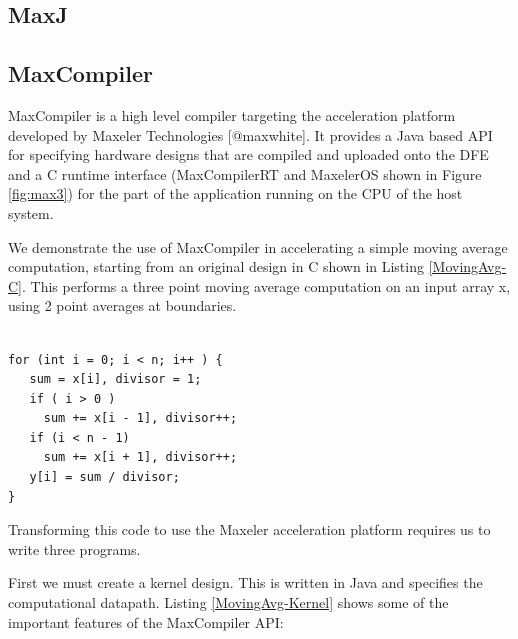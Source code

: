 \subsection{MaxJ}

\subsection{MaxCompiler}

MaxCompiler is a high level compiler targeting the acceleration
platform developed by Maxeler Technologies [@maxwhite]. It provides a
Java based API for specifying hardware designs that are compiled and
uploaded onto the DFE and a C runtime interface (MaxCompilerRT and
MaxelerOS shown in Figure \ref{fig:max3}) for the part of the
application running on the CPU of the host system.

We demonstrate the use of MaxCompiler in accelerating a simple moving
average computation, starting from an original design in C shown in
Listing \ref{MovingAvg-C}. This performs a three point moving average
computation on an input array x, using 2 point averages at boundaries.


\begin{lstlisting}

for (int i = 0; i < n; i++ ) {
   sum = x[i], divisor = 1;
   if ( i > 0 )
     sum += x[i - 1], divisor++;
   if (i < n - 1)
     sum += x[i + 1], divisor++;
   y[i] = sum / divisor;
}
\end{lstlisting}



Transforming this code to use the Maxeler acceleration platform
requires us to write three programs.

First we must create a kernel design. This is written in Java and
specifies the computational datapath. Listing \ref{MovingAvg-Kernel}
shows some of the important features of the MaxCompiler API:


